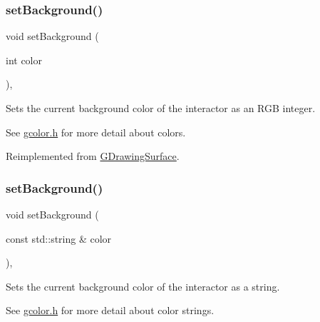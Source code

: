 \mbox{\label{classsgl_1_1GWindow_a10d305826534b55561ea88730fc9f6cd}} 
\subsubsection{\texorpdfstring{set\+Background()}{setBackground()}\hspace{0.1cm}{\footnotesize\ttfamily [1/2]}}
{\footnotesize\ttfamily void set\+Background (\begin{DoxyParamCaption}\item[{int}]{color }\end{DoxyParamCaption})\hspace{0.3cm}{\ttfamily [override]}, {\ttfamily [virtual]}}



Sets the current background color of the interactor as an R\+GB integer. 

See \mbox{\hyperlink{gcolor_8h_source}{gcolor.\+h}} for more detail about colors. 

Reimplemented from \mbox{\hyperlink{classsgl_1_1GDrawingSurface_aba673fd56570a074aba10fa059524b96}{G\+Drawing\+Surface}}.

\mbox{\label{classsgl_1_1GWindow_a9cb99695b93494c7ba28268ce9e42c2a}} 
\subsubsection{\texorpdfstring{set\+Background()}{setBackground()}\hspace{0.1cm}{\footnotesize\ttfamily [2/2]}}
{\footnotesize\ttfamily void set\+Background (\begin{DoxyParamCaption}\item[{const std\+::string \&}]{color }\end{DoxyParamCaption})\hspace{0.3cm}{\ttfamily [override]}, {\ttfamily [virtual]}}



Sets the current background color of the interactor as a string. 

See \mbox{\hyperlink{gcolor_8h_source}{gcolor.\+h}} for more detail about color strings. 

